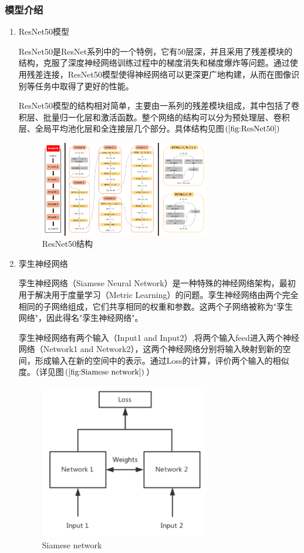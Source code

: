 \documentclass[UTF8]{ctexart}
\begin{document}
\subsubsection{模型介绍}
\begin{enumerate}
  \item ResNet50模型

  ResNet50是ResNet系列中的一个特例，它有50层深，并且采用了残差模块的结构，克服了深度神经网络训练过程中的梯度消失和梯度爆炸等问题。通过使用残差连接，ResNet50模型使得神经网络可以更深更广地构建，从而在图像识别等任务中取得了更好的性能。

  ResNet50模型的结构相对简单，主要由一系列的残差模块组成，其中包括了卷积层、批量归一化层和激活函数。整个网络的结构可以分为预处理层、卷积层、全局平均池化层和全连接层几个部分。具体结构见图$\left(\ref{fig:ResNet50}\right)$
  \begin{figure}[!ht]
    \centering
    \includegraphics[width=0.7\textwidth]{ResNet50.png}
    \caption{ResNet50结构}
    \label{fig:ResNet50}
  \end{figure}
  \item 孪生神经网络
  
  孪生神经网络（Siamese Neural Network）是一种特殊的神经网络架构，最初用于解决用于度量学习（Metric Learning）的问题。孪生神经网络由两个完全相同的子网络组成，它们共享相同的权重和参数。这两个子网络被称为"孪生网络"，因此得名"孪生神经网络"。

  孪生神经网络有两个输入（Input1 and Input2）,将两个输入feed进入两个神经网络（Network1 and Network2），这两个神经网络分别将输入映射到新的空间，形成输入在新的空间中的表示。通过Loss的计算，评价两个输入的相似度。（详见图$\left(\ref{fig:Siamese network}\right)$）
  \begin{figure}[!ht]
    \centering
    \includegraphics[width=0.7\textwidth]{Siamese network.png}
    \caption{Siamese network}
    \label{fig:Siamese network}
  \end{figure}
\end{enumerate}
\end{document}
